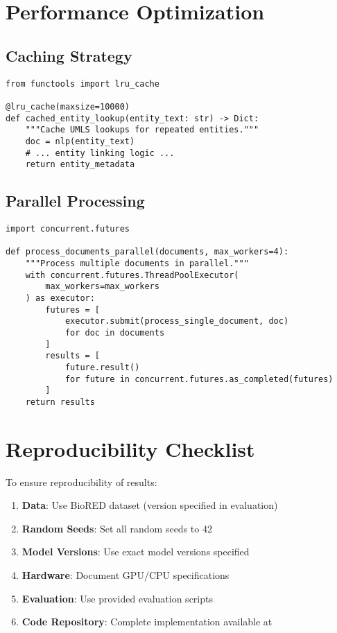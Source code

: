 \section{Performance Optimization}

\subsection{Caching Strategy}
\begin{verbatim}
from functools import lru_cache

@lru_cache(maxsize=10000)
def cached_entity_lookup(entity_text: str) -> Dict:
    """Cache UMLS lookups for repeated entities."""
    doc = nlp(entity_text)
    # ... entity linking logic ...
    return entity_metadata
\end{verbatim}

\subsection{Parallel Processing}
\begin{verbatim}
import concurrent.futures

def process_documents_parallel(documents, max_workers=4):
    """Process multiple documents in parallel."""
    with concurrent.futures.ThreadPoolExecutor(
        max_workers=max_workers
    ) as executor:
        futures = [
            executor.submit(process_single_document, doc) 
            for doc in documents
        ]
        results = [
            future.result() 
            for future in concurrent.futures.as_completed(futures)
        ]
    return results
\end{verbatim}

\section{Reproducibility Checklist}

To ensure reproducibility of results:

\begin{enumerate}
    \item \textbf{Data}: Use BioRED dataset (version specified in evaluation)
    \item \textbf{Random Seeds}: Set all random seeds to 42
    \item \textbf{Model Versions}: Use exact model versions specified
    \item \textbf{Hardware}: Document GPU/CPU specifications
    \item \textbf{Evaluation}: Use provided evaluation scripts
    \item \textbf{Code Repository}: Complete implementation available at \cite{githubthesis2025}
\end{enumerate}

